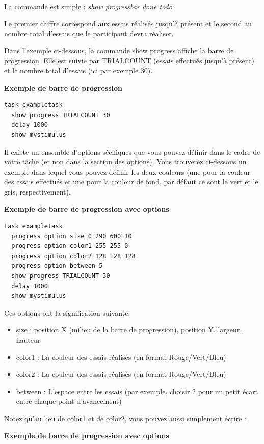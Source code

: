 \documentclass[
]{book}
\providecommand{\tightlist}{%
  \setlength{\itemsep}{0pt}\setlength{\parskip}{0pt}}
\begin{document}
La commande est simple : \emph{show progressbar done todo}

Le premier chiffre correspond aux essais réalisés jusqu'à présent et le second au nombre total d'essais que le participant devra réaliser.

Dans l'exemple ci-dessous, la commande show progress affiche la barre de progression. Elle est suivie par TRIALCOUNT (essais effectués jusqu'à présent) et le nombre total d'essais (ici par exemple 30).

\textbf{Exemple de barre de progression}

\begin{verbatim}
task exampletask
  show progress TRIALCOUNT 30
  delay 1000
  show mystimulus
\end{verbatim}

Il existe un ensemble d'options sécifiques que vous pouvez définir dans le cadre de votre tâche (et non dans la section des options). Vous trouverez ci-dessous un exemple dans lequel vous pouvez définir les deux couleurs (une pour la couleur des essais effectués et une pour la couleur de fond, par défaut ce sont le vert et le gris, respectivement).

\textbf{Exemple de barre de progression avec options}

\begin{verbatim}
task exampletask
  progress option size 0 290 600 10
  progress option color1 255 255 0
  progress option color2 128 128 128
  progress option between 5
  show progress TRIALCOUNT 30
  delay 1000
  show mystimulus
\end{verbatim}

Ces options ont la signification suivante.

\begin{itemize}
\tightlist
\item
  size : position X (milieu de la barre de progression), position Y, largeur, hauteur
\item
  color1 : La couleur des essais réalisés (en format Rouge/Vert/Bleu)
\item
  color2 : La couleur des essais réalisés (en format Rouge/Vert/Bleu)
\item
  between : L'espace entre les essais (par exemple, choisir 2 pour un petit écart entre chaque point d'avancement)
\end{itemize}

Notez qu'au lieu de color1 et de color2, vous pouvez aussi simplement écrire :

\textbf{Exemple de barre de progression avec options}
\end{document}
